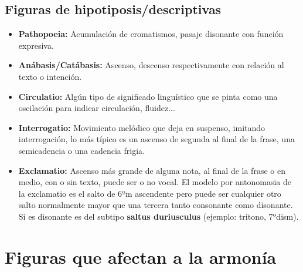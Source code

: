 \documentclass[11pt,a4paper]{article}
\begin{document}
		\subsection{Figuras de hipotiposis/descriptivas}
			\begin{itemize}
				\item \textbf{Pathopoeia:} Acumulación de cromatismos, pasaje disonante con función expresiva.
				\item \textbf{Anábasis/Catábasis:} Ascenso, descenso respectivamente con relación al texto o intención.
				\item \textbf{Circulatio:} Algún tipo de significado linguístico que se pinta como una oscilación para indicar circulación, fluidez...
				\item \textbf{Interrogatio:} Movimiento melódico que deja en suspenso, imitando interrogación, lo más típico es un ascenso de segunda al final de la frase, una semicadencia o una cadencia frigia.
				\item \textbf{Exclamatio:} Ascenso más grande de alguna nota, al final de la frase o en medio, con o sin texto, puede ser o no vocal. El modelo por antonomasia de la exclamatio es el salto de 6ºm ascendente pero puede ser cualquier otro salto normalmente mayor que una tercera tanto consonante como disonante. Si es disonante es del subtipo \textbf{saltus duriusculus} (ejemplo: tritono, 7ºdism).
				
			\end{itemize}
	\section{Figuras que afectan a la armonía}
\end{document}
